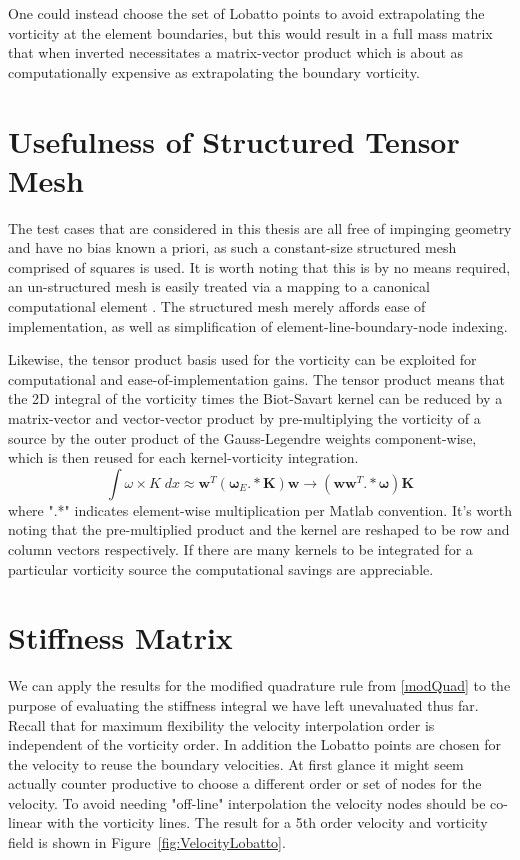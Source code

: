 \documentclass[letterpaper,12pt]{report}
\newcommand{\be}{\begin{equation}}
\newcommand{\ee}{\end{equation}}
\begin{document}
One could instead choose the set of Lobatto points to avoid extrapolating the vorticity at the element boundaries, but this would result in a full mass matrix that when inverted necessitates a matrix-vector product which is about as computationally expensive as extrapolating the boundary vorticity.
%
\section{Usefulness of Structured Tensor Mesh}
The test cases that are considered in this thesis are all free of impinging geometry and have no bias known a priori, as such a constant-size structured mesh comprised of squares is used. It is worth noting that this is by no means required, an un-structured mesh is easily treated via a mapping to a canonical computational element \cite{Persson2013}. The structured mesh merely affords ease of implementation, as well as simplification of element-line-boundary-node indexing.

Likewise, the tensor product basis used for the vorticity can be exploited for computational and ease-of-implementation gains. The tensor product means that the 2D integral of the vorticity times the Biot-Savart kernel can be reduced by a matrix-vector and vector-vector product by pre-multiplying the vorticity of a source by the outer product of the Gauss-Legendre weights component-wise, which is then reused for each kernel-vorticity integration.
\be \int \omega \times K \;dx \approx \boldsymbol{w}^T(\boldsymbol{\omega}_E.*\boldsymbol{K}) \boldsymbol{w} \rightarrow (\boldsymbol{ww}^T.*\boldsymbol{\omega})\boldsymbol{K} \ee
where ".*" indicates element-wise multiplication per Matlab convention. It's worth noting that the pre-multiplied product and the kernel are reshaped to be row and column vectors respectively. If there are many kernels to be integrated for a particular vorticity source the computational savings are appreciable.
%
\section{Stiffness Matrix}
We can apply the results for the modified quadrature rule from \eqref{modQuad} to the purpose of evaluating the stiffness integral we have left unevaluated thus far. Recall that for maximum flexibility the velocity interpolation order is independent of the vorticity order. In addition the Lobatto points are chosen for the velocity to reuse the boundary velocities. At first glance it might seem actually counter productive to choose a different order or set of nodes for the velocity. To avoid needing "off-line" interpolation the velocity nodes should be co-linear with the vorticity lines. The result for a 5th order velocity and vorticity field is shown in Figure~\ref{fig:VelocityLobatto}.
\end{document}
